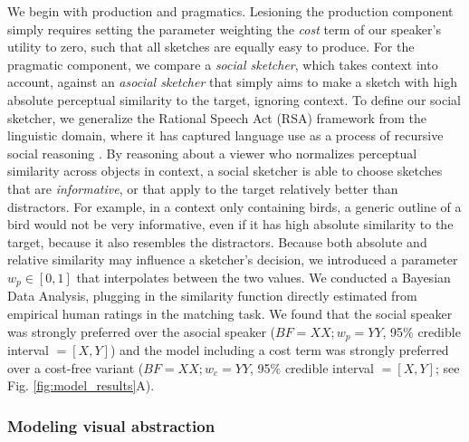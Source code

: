 \documentclass[9pt,twocolumn,twoside]{pnas-new}
\begin{document}
We begin with production and pragmatics. Lesioning the production component simply requires setting the parameter weighting the \emph{cost} term of our speaker's utility to zero, such that all sketches are equally easy to produce. For the pragmatic component, we compare a \emph{social sketcher}, which takes context into account, against an \emph{asocial sketcher} that simply aims to make a sketch with high absolute perceptual similarity to the target, ignoring context. To define our social sketcher, we generalize the Rational Speech Act (RSA) framework from the linguistic domain, where it has captured language use as a process of recursive social reasoning \cite{goodman2016pragmatic,kao2014formalizing,goodman2013knowledge}. By reasoning about a viewer who normalizes perceptual similarity across objects in context, a social sketcher is able to choose sketches that are \emph{informative}, or that apply to the target relatively better than distractors. For example, in a context only containing birds, a generic outline of a bird would not be very informative, even if it has high absolute similarity to the target, because it also resembles the distractors. Because both absolute and relative similarity may influence a sketcher's decision, we introduced a parameter $w_p \in [0,1]$ that interpolates between the two values. We conducted a Bayesian Data Analysis, plugging in the similarity function directly estimated from empirical human ratings in the matching task. We found that the social speaker was strongly preferred over the asocial speaker ($BF = XX; w_p = YY$, 95\% credible interval $= [X, Y]$) and the model including a cost term was strongly preferred over a cost-free variant ($BF = XX; w_c = YY$, 95\% credible interval $=[X, Y]$; see Fig. \ref{fig:model_results}A).



\subsubsection*{Modeling visual abstraction}
\end{document}
